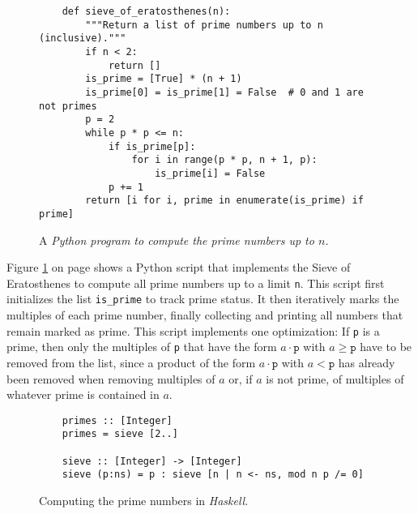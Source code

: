 \begin{figure}[!ht]
\centering
\begin{verbatim}
    def sieve_of_eratosthenes(n):
        """Return a list of prime numbers up to n (inclusive)."""
        if n < 2:
            return []    
        is_prime = [True] * (n + 1)
        is_prime[0] = is_prime[1] = False  # 0 and 1 are not primes
        p = 2
        while p * p <= n:
            if is_prime[p]:
                for i in range(p * p, n + 1, p):
                    is_prime[i] = False
            p += 1
        return [i for i, prime in enumerate(is_prime) if prime]
\end{verbatim}
\vspace*{-0.3cm}
\caption{A \textsl{Python program to compute the prime numbers up to $n$.}}
\label{fig:primes.py}
\end{figure}
Figure \ref{fig:primes.py} on page \pageref{fig:primes.py} shows a Python script that implements the Sieve of
Eratosthenes to compute all prime numbers up to a limit \texttt{n}.  This script first initializes the list
\texttt{is\_prime} to track prime status. It then iteratively marks the multiples of each prime number, finally
collecting and printing all numbers that remain marked as prime.  This script implements one optimization: If
\texttt{p} is a prime, then only the multiples of \texttt{p} that have the form $a \cdot \mathtt{p}$ with
$a \geq \mathtt{p}$ have to be removed from the list, since a product of the form $a \cdot \mathtt{p}$ with
$a < \mathtt{p}$ has already been removed when removing multiples  
of $a$ or, if $a$ is not prime, of multiples of whatever prime is contained in $a$.



\begin{figure}[!ht]
\centering
\begin{verbatim}
    primes :: [Integer]
    primes = sieve [2..]
    
    sieve :: [Integer] -> [Integer]
    sieve (p:ns) = p : sieve [n | n <- ns, mod n p /= 0]
\end{verbatim}
\vspace*{-0.3cm}
\caption{Computing the prime numbers in \textsl{Haskell}.}
\label{fig:primes.hs}
\end{figure}

